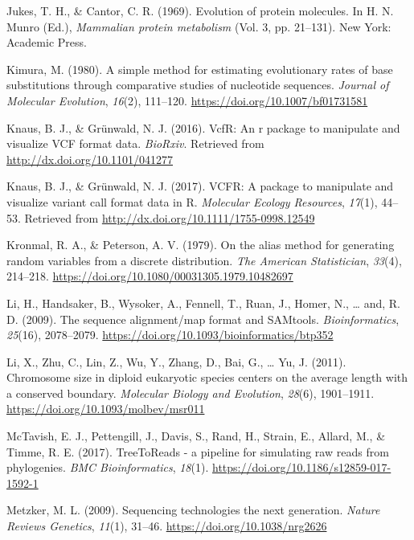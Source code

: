 \documentclass[12pt,]{article}
\begin{document}
\leavevmode\hypertarget{ref-JC69}{}%
Jukes, T. H., \& Cantor, C. R. (1969). Evolution of protein molecules. In H. N. Munro (Ed.), \emph{Mammalian protein metabolism} (Vol. 3, pp. 21--131). New York: Academic Press.

\leavevmode\hypertarget{ref-Kimura_1980}{}%
Kimura, M. (1980). A simple method for estimating evolutionary rates of base substitutions through comparative studies of nucleotide sequences. \emph{Journal of Molecular Evolution}, \emph{16}(2), 111--120. \url{https://doi.org/10.1007/bf01731581}

\leavevmode\hypertarget{ref-Knaus_2016}{}%
Knaus, B. J., \& Grünwald, N. J. (2016). VcfR: An r package to manipulate and visualize VCF format data. \emph{BioRxiv}. Retrieved from \url{http://dx.doi.org/10.1101/041277}

\leavevmode\hypertarget{ref-Knaus_2017}{}%
Knaus, B. J., \& Grünwald, N. J. (2017). VCFR: A package to manipulate and visualize variant call format data in R. \emph{Molecular Ecology Resources}, \emph{17}(1), 44--53. Retrieved from \url{http://dx.doi.org/10.1111/1755-0998.12549}

\leavevmode\hypertarget{ref-Kronmal_1979}{}%
Kronmal, R. A., \& Peterson, A. V. (1979). On the alias method for generating random variables from a discrete distribution. \emph{The American Statistician}, \emph{33}(4), 214--218. \url{https://doi.org/10.1080/00031305.1979.10482697}

\leavevmode\hypertarget{ref-Li_2009}{}%
Li, H., Handsaker, B., Wysoker, A., Fennell, T., Ruan, J., Homer, N., \ldots{} and, R. D. (2009). The sequence alignment/map format and SAMtools. \emph{Bioinformatics}, \emph{25}(16), 2078--2079. \url{https://doi.org/10.1093/bioinformatics/btp352}

\leavevmode\hypertarget{ref-Li_2011}{}%
Li, X., Zhu, C., Lin, Z., Wu, Y., Zhang, D., Bai, G., \ldots{} Yu, J. (2011). Chromosome size in diploid eukaryotic species centers on the average length with a conserved boundary. \emph{Molecular Biology and Evolution}, \emph{28}(6), 1901--1911. \url{https://doi.org/10.1093/molbev/msr011}

\leavevmode\hypertarget{ref-McTavish_2017}{}%
McTavish, E. J., Pettengill, J., Davis, S., Rand, H., Strain, E., Allard, M., \& Timme, R. E. (2017). TreeToReads - a pipeline for simulating raw reads from phylogenies. \emph{BMC Bioinformatics}, \emph{18}(1). \url{https://doi.org/10.1186/s12859-017-1592-1}

\leavevmode\hypertarget{ref-Metzker_2009}{}%
Metzker, M. L. (2009). Sequencing technologies the next generation. \emph{Nature Reviews Genetics}, \emph{11}(1), 31--46. \url{https://doi.org/10.1038/nrg2626}
\end{document}
